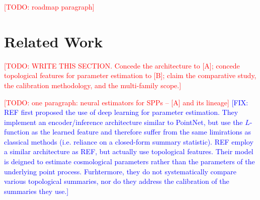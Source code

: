 \documentclass[11pt,letterpaper]{article}
\newcommand{\1}{\mathds{1}}
\newcommand{\todo}[1]{\textcolor{red}{[TODO: #1]}}
\newcommand{\fix}[1]{\textcolor{blue}{[FIX: #1]}}
\newcommand{\todo}[1]{}
\newcommand{\fix}[1]{}
\theoremstyle{plain}
\theoremstyle{definitioncolon}
\begin{document}
\todo{roadmap paragraph}


%
%
%
\section{Related Work}

\todo{WRITE THIS SECTION. Concede the architecture to [A]; concede topological
features for parameter estimation to [B]; claim the comparative study, the
calibration methodology, and the multi-family scope.}

\todo{one paragraph: neural estimators for SPPs -- [A] and its lineage}
\fix{REF first proposed the use of deep learning for parameter estimation. They implement
an encoder/inference architecture similar to PointNet, but use the $L$-function as the learned
feature and therefore suffer from the same limirations as classical methods (i.e. reliance
on a closed-form summary statistic). REF employ a similar architecture as REF, but actually use
topological features. Their model is deigned to estimate cosmological parameters rather than the
parameters of the underlying point process. Furhtermore, they do not systematically compare 
various topological summaries, nor do they address the calibration of the summaries they use.}
\end{document}
